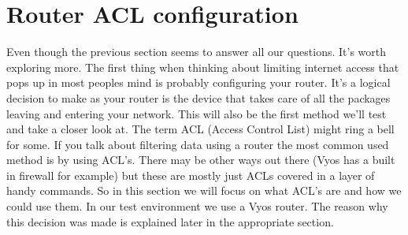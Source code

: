 \section{Router ACL configuration}
Even though the previous section seems to answer all our questions. It's worth exploring more. The first thing when thinking about limiting internet access that pops up in most peoples mind is probably configuring your router.  It's a logical decision to make as your router is the device that takes care of all the packages leaving and entering your network. This will also be the first method we'll test and take a closer look at. The term ACL (Access Control List) might ring a bell for some. If you talk about filtering data using a router the most common used method is by using ACL's. There may be other ways out there (Vyos has a built in firewall for example) but these are mostly just ACLs covered in a layer of handy commands. So in this section we will focus on what ACL's are and how we could use them.
In our test environment we use a Vyos router. The reason why this decision was made is explained later in the appropriate section.
